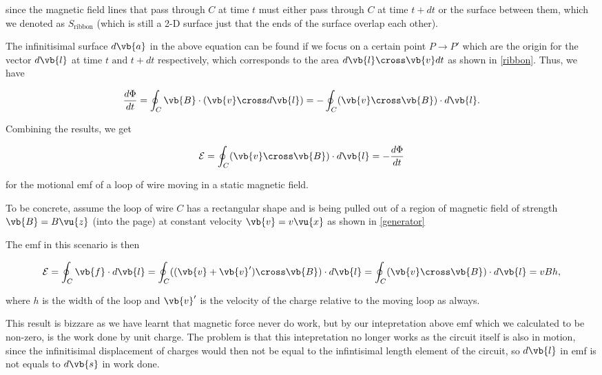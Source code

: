 \documentclass[english,a4paper,12pt]{report}
\begin{document}
since the magnetic field lines that pass through \(C\) at time \(t\) must either pass through \(C\) at time \(t+dt\) or the surface between them, which we denoted as \(S _{\text{ribbon} } \) (which is still a 2-D surface just that the ends of the surface overlap each other). 

The infinitisimal surface \(d \vb{a} \) in the above equation can be found if we focus on a certain point \(P \rightarrow P'\) which are the origin for the vector \(d \vb{l} \) at time \(t \text { and }  t+dt\) respectively, which corresponds to the area \(d \vb{l} \cross \vb{v} dt\) as shown in \cref{ribbon}. Thus, we have

\begin{equation}
    \frac{d\Phi }{dt} = \oint_{C} \vb{B} \cdot (\vb{v} \cross d \vb{l} ) = -\oint_{C} (\vb{v} \cross \vb{B} ) \cdot d \vb{l}.    
\end{equation}

Combining the results, we get 

\begin{equation} \label{motionalemf} 
    \mathcal{E} = \oint_{C} (\vb{v} \cross \vb{B} )\cdot d \vb{l} = -\frac{d\Phi }{dt}
\end{equation}

for the motional emf of a loop of wire moving in a static magnetic field.

To be concrete, assume the loop of wire \(C\)  has a rectangular shape and is being pulled out of a region of magnetic field of strength \(\vb{B} = B \vu{z}  \) (into the page) at constant velocity \(\vb{v} = v \vu{x} \)  as shown in \cref{generator}  


The emf in this scenario is then 

\begin{equation}
    \mathcal{E} = \oint_{C} \vb{f}  \cdot d \vb{l} = \oint_{C} ((\vb{v} + \vb{v} ') \cross \vb{B} ) \cdot  d\vb{l}  = \oint_{C}(\vb{v} \cross \vb{B} )\cdot d \vb{l} =  vBh ,
\end{equation}

where \(h\) is the width of the loop and \(\vb{v} '\) is the velocity of the charge relative to the moving loop as always.

This result is bizzare as we have learnt that magnetic force never do work, but by our intepretation above emf which we calculated to be non-zero, is the work done by unit charge. The problem is that this intepretation no longer works as the circuit itself is also in motion, since the infinitisimal displacement of charges would then not be equal to the infintisimal length element of the circuit, so \(d \vb{l} \)  in emf is not equals to \(d \vb{s} \)  in work done.
\end{document}
